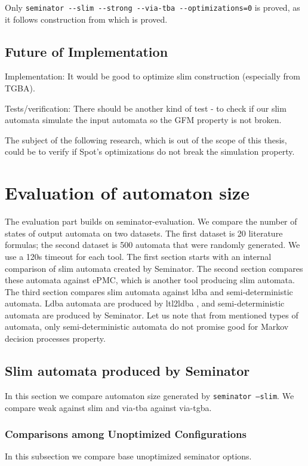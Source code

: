 \documentclass[
	digital,
nolof, nolot
]{fithesis3}
\begin{document}
	Only \texttt{seminator -{}-slim -{}-strong -{}-via-tba -{}-optimizations=0} is proved, as it follows construction from \cite{hlavni} which is proved.
	
	\section{Future of Implementation}
	Implementation:
	It would be good to optimize slim construction (especially from TGBA).
	
	
	
	Tests/verification:
	There should be another kind of test - to check if our slim automata simulate the input automata so the GFM property is not broken.
	
	The subject of the following research, which is out of the scope of this thesis, could be to verify if Spot's optimizations do not break the simulation property. 
	
	\chapter{Evaluation of automaton size}
	The evaluation part builds on seminator-evaluation. We compare the number of states of output automata on two datasets. The first dataset is 20 literature formulas; the second dataset is 500 automata that were randomly generated. We use a 120s timeout for each tool. The first section starts with an internal comparison of slim automata created by Seminator. The second section compares these automata against ePMC, which is another tool producing slim automata. The third section compares slim automata against ldba and semi-deterministic automata. Ldba automata are produced by ltl2ldba \cite{ltl2ldba}, and semi-deterministic automata are produced by Seminator. Let us note that from mentioned types of automata, only semi-deterministic automata do not promise good for Markov decision processes property.
	
	\section{Slim automata produced by Seminator}
	In this section we compare automaton size generated by \texttt{seminator --slim}.
	We compare weak against slim and via-tba against via-tgba.
	\subsection{Comparisons among Unoptimized Configurations}
	In this subsection we compare base unoptimized seminator options.
	
\end{document}
